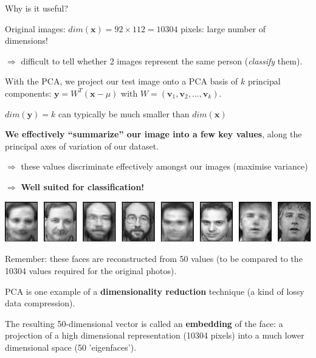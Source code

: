 \documentclass[compress]{beamer}
\begin{document}

\begin{frame}{Why is it useful?}


    Original images: $dim(\mathbf{x}) = 92 \times 112 = 10304$ pixels: large number of dimensions!

    $\Rightarrow$ difficult to tell whether 2 images represent the same person
    (\ie \emph{classify} them).

    \pause

    With the PCA, we project our test image onto a PCA basis of $k$ principal
    components: $\mathbf{y} = W^{T} (\mathbf{x} - \mu)$ with $W = (\mathbf{v}_{1}, \mathbf{v}_{2}, \ldots, \mathbf{v}_{k})$.


    $dim(\mathbf{y}) = k$ can typically be much smaller than $dim(\mathbf{x})$

    \pause

    \textbf{We effectively ``summarize'' our image into a few key values}, along
    the principal axes of variation of our dataset.

    $\Rightarrow$ these values discriminate effectively amongst our images
    (maximise variance)
    
    $\Rightarrow$ \textbf{Well suited for classification!}

\end{frame}


\begin{frame}{}
    \begin{center}
        \includegraphics[width=\linewidth]{reconstruction-50-eigenfaces-top-row}

        \vspace{2em}
        Remember: these faces are reconstructed from 50 values (to be compared
        to the 10304 values required for the original photos).

        \vspace{2em}

        \pause

        PCA is one example of a \textbf{dimensionality reduction} technique (\ie a
        kind of lossy data compression).

        \pause 

        The resulting 50-dimensional vector is called an \textbf{embedding} of
        the face: a projection of a high dimensional representation (10304 pixels)
        into a much lower dimensional space (50 'eigenfaces').


    \end{center}
\end{frame}
\end{document}
